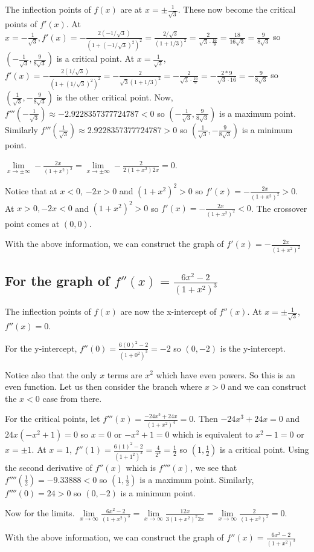 \documentclass[9pt]{article}
\begin{document}
The inflection points of $f(x)$ are at $x = \pm\frac{1}{\sqrt{3}}$. These now become the critical points of $f'(x)$. At $x = -\frac{1}{\sqrt{3}}, f'(x) = -\frac{2 (- 1 / \sqrt{3})}{(1 + (- 1 / \sqrt{3})^2)^2} = \frac{2 / \sqrt{3}}{(1 + 1/3)^2} = \frac{2}{\sqrt{3} \cdot \frac{16}{9}} = \frac{18}{16 \sqrt{3}} = \frac{9}{8 \sqrt{3}}$ so $(-\frac{1}{\sqrt{3}}, \frac{9}{8 \sqrt{3}})$ is a critical point. At $x = \frac{1}{\sqrt{3}}$, $f'(x) = -\frac{2 (1 / \sqrt{3})}{(1 + (1 / \sqrt{3})^2)^2} = -\frac{2}{\sqrt{3} (1 + 1/3)^2} = -\frac{2}{\sqrt{3} \cdot \frac{16}{9}} = -\frac{2 * 9}{\sqrt{3} \cdot 16} = -\frac{9}{8 \sqrt{3}}$ so $(\frac{1}{\sqrt{3}}, -\frac{9}{8 \sqrt{3}})$ is the other critical point. Now, $f'''(-\frac{1}{\sqrt{3}}) \approx -2.9228357377724787 < 0$ so $(-\frac{1}{\sqrt{3}}, \frac{9}{8 \sqrt{3}})$ is a maximum point. Similarly $f'''(\frac{1}{\sqrt{3}}) \approx 2.9228357377724787 > 0$ so $(\frac{1}{\sqrt{3}}, -\frac{9}{8 \sqrt{3}})$ is a minimum point.

$\lim\limits_{x \rightarrow \pm\infty} -\frac{2x}{(1 + x^2)^2} = \lim\limits_{x \rightarrow \pm\infty} -\frac{2}{2(1 + x^2)2x} = 0$.

Notice that at $x < 0$, $-2x > 0$ and $(1 + x^2)^2 > 0$ so $f'(x) = -\frac{2x}{(1 + x^2)^2} > 0$. At $x > 0, -2x < 0$ and $(1 + x^2)^2 > 0$ so $f'(x) = -\frac{2x}{(1 + x^2)^2} < 0$. The crossover point comes at $(0, 0)$.

With the above information, we can construct the graph of $f'(x) = -\frac{2x}{(1 + x^2)^2}$

\subsection*{For the graph of $f''(x) = \frac{6x^2 - 2}{(1 + x^2)^3}$}

The inflection points of $f(x)$ are now the x-intercept of $f''(x)$. At $x = \pm \frac{1}{\sqrt{3}}$, $f''(x) = 0$.

For the y-intercept, $f''(0) = \frac{6(0)^2 - 2}{(1 + 0^2)^3} = -2$ so $(0, -2)$ is the y-intercept.

Notice also that the only $x$ terms are $x^2$ which have even powers. So this is an even function. Let us then consider the branch where $x > 0$ and we can construct the $x < 0$ case from there.

For the critical points, let $f'''(x) = \frac{-24x^3 + 24x}{(1 + x^2)^4} = 0$. Then $-24x^3 + 24x = 0$ and $24x(- x^2 + 1) = 0$ so $x = 0$ or $-x^2 + 1 = 0$ which is equivalent to $x^2 - 1 = 0$ or $x = \pm 1$. At $x = 1$, $f''(1) = \frac{6(1)^2 - 2}{(1 + 1^2)^3} = \frac{4}{2^3} = \frac{1}{2}$ so $(1, \frac{1}{2})$ is a critical point. Using the second derivative of $f''(x)$ which is $f''''(x)$, we see that $f''''(\frac{1}{2}) = -9.33888 < 0$ so $(1, \frac{1}{2})$ is a maximum point. Similarly, $f''''(0) = 24 > 0$ so $(0, -2)$ is a minimum point.

Now for the limits. $\lim\limits_{x \rightarrow \infty}\frac{6x^2 - 2}{(1 + x^2)^3} = \lim\limits_{x \rightarrow \infty}\frac{12x}{3(1 + x^2)^2 2x} = \lim\limits_{x \rightarrow \infty}\frac{2}{(1 + x^2)^2} = 0$.

With the above information, we can construct the graph of $f''(x) = \frac{6x^2 - 2}{(1 + x^2)^3}$
\end{document}

